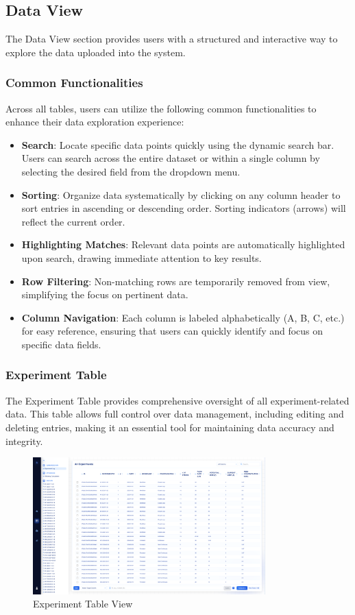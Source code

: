 \documentclass[12pt]{article}
\begin{document}
\subsection{Data View}

The Data View section provides users with a structured and interactive way to
explore the data uploaded into the system. 

\subsubsection{Common Functionalities}
Across all tables, users can utilize the following common functionalities to
enhance their data exploration experience:
\begin{itemize}
    \item \textbf{Search}: Locate specific data points quickly using the dynamic
    search bar. Users can search across the entire dataset or within a single
    column by selecting the desired field from the dropdown menu.
    \item \textbf{Sorting}: Organize data systematically by clicking on any
    column header to sort entries in ascending or descending order. Sorting
    indicators (arrows) will reflect the current order.
    \item \textbf{Highlighting Matches}: Relevant data points are automatically
    highlighted upon search, drawing immediate attention to key results.
    \item \textbf{Row Filtering}: Non-matching rows are temporarily removed from
    view, simplifying the focus on pertinent data.
    \item \textbf{Column Navigation}: Each column is labeled alphabetically (A,
    B, C, etc.) for easy reference, ensuring that users can quickly identify and
    focus on specific data fields.
\end{itemize}

\subsubsection{Experiment Table}
The Experiment Table  provides comprehensive oversight of all experiment-related
data. This table allows full control over data management, including editing and
deleting entries, making it an essential tool for maintaining data accuracy and
integrity.

\begin{figure}[H]
    \centering
    \includegraphics[width=0.8\textwidth]{./Diagrams/ExperimentTableView.png}
    \caption{Experiment Table View}
\end{figure}
\end{document}
